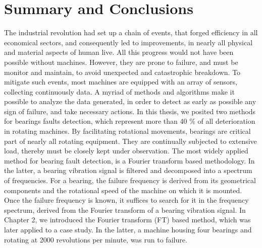 \documentclass[thesis.tex]{subfiles}
\begin{document}
	\section{Summary and Conclusions}
	\label{sec:summary_and_conclusions}
	The industrial revolution had set up a chain of events, that forged efficiency in all economical sectors, and consequently led to improvements, in nearly all physical and material aspects of human live. All this progress would not have been possible without machines. However, they are prone to failure, and must be monitor and maintain, to avoid unexpected and catastrophic breakdown. To mitigate such events, most machines are equipped with an array of sensors, collecting continuously data. A myriad of methods and algorithms make it possible to analyze the data generated, in order to detect as early as possible any sign of failure, and take necessary actions.
	\justify
	In this thesis, we posited two methods for bearings faults detection, which represent more than 40 $\%$ of all deterioration in rotating machines. By facilitating rotational movements, bearings are critical part of nearly all rotating equipment. They are continually subjected to extensive load, thereby must be closely kept under observation. The most widely applied method for bearing fault detection, is a Fourier transform based methodology. In the latter, a bearing vibration signal is filtered and decomposed into a spectrum of frequencies. For a bearing, the failure frequency is derived from its geometrical components and the rotational speed of the machine on which it is mounted. Once the failure frequency is known, it suffices to search for it in the frequency spectrum, derived from the Fourier transform of a bearing vibration signal. 
	\justify
	In Chapter 2, we introduced the Fourier transform (FT) based method, which was later applied to a case study.
	In the latter, a machine housing four bearings and rotating at 2000 revolutions per minute, was run to failure.
\end{document}

